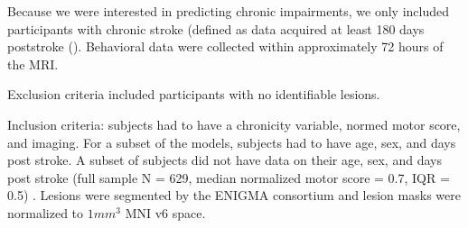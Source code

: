 \documentclass[10pt]{article}
\begin{document}
Because we were interested in predicting chronic impairments, we only included participants with chronic stroke (defined as data acquired at least 180 days poststroke (\cite{Bernhardt2017-av}). Behavioral data were collected within approximately 72 hours of the MRI. 


Exclusion criteria included participants with no identifiable lesions. 

Inclusion criteria: subjects had to have a chronicity variable, normed motor score, and imaging.
For a subset of the models, subjects had to have age, sex, and days post stroke. A subset of subjects did not have data on their age, sex, and days post stroke (full sample N = 629, median normalized motor score = 0.7, IQR = 0.5) .
Lesions were segmented by the ENIGMA consortium and lesion masks were normalized to $1mm^3$ MNI v6 space. 
\end{document}
